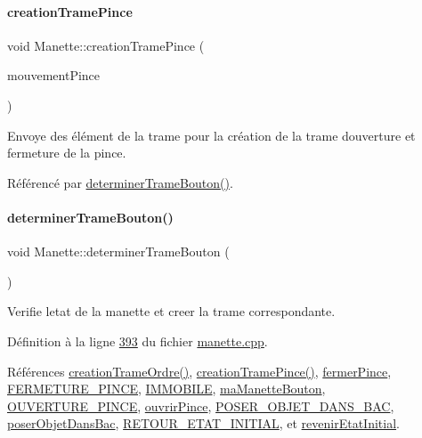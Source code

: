 \paragraph{\texorpdfstring{creation\+Trame\+Pince}{creationTramePince}}
{\footnotesize\ttfamily void Manette\+::creation\+Trame\+Pince (\begin{DoxyParamCaption}\item[{Q\+String}]{mouvement\+Pince }\end{DoxyParamCaption})\hspace{0.3cm}{\ttfamily [signal]}}



Envoye des élément de la trame pour la création de la trame d\textquotesingle{}ouverture et fermeture de la pince. 



Référencé par \hyperlink{manette_8cpp_source_l00393}{determiner\+Trame\+Bouton()}.

\mbox{\label{class_manette_a3fb9d1245400b6bb6379fbb63a8099ba}} 
\paragraph{\texorpdfstring{determiner\+Trame\+Bouton()}{determinerTrameBouton()}}
{\footnotesize\ttfamily void Manette\+::determiner\+Trame\+Bouton (\begin{DoxyParamCaption}{ }\end{DoxyParamCaption})}



Verifie l\textquotesingle{}etat de la manette et creer la trame correspondante. 



Définition à la ligne \hyperlink{manette_8cpp_source_l00393}{393} du fichier \hyperlink{manette_8cpp_source}{manette.\+cpp}.



Références \hyperlink{class_manette_ad28d8f539df6b73805ae94e9bbd827ec}{creation\+Trame\+Ordre()}, \hyperlink{class_manette_a16cb602cf7001f78b115f395fad47586}{creation\+Trame\+Pince()}, \hyperlink{manette_8h_source_l00217}{fermer\+Pince}, \hyperlink{manette_8h_source_l00086}{F\+E\+R\+M\+E\+T\+U\+R\+E\+\_\+\+P\+I\+N\+CE}, \hyperlink{manette_8h_source_l00032}{I\+M\+M\+O\+B\+I\+LE}, \hyperlink{manette_8h_source_l00215}{ma\+Manette\+Bouton}, \hyperlink{manette_8h_source_l00080}{O\+U\+V\+E\+R\+T\+U\+R\+E\+\_\+\+P\+I\+N\+CE}, \hyperlink{manette_8h_source_l00216}{ouvrir\+Pince}, \hyperlink{manette_8h_source_l00092}{P\+O\+S\+E\+R\+\_\+\+O\+B\+J\+E\+T\+\_\+\+D\+A\+N\+S\+\_\+\+B\+AC}, \hyperlink{manette_8h_source_l00218}{poser\+Objet\+Dans\+Bac}, \hyperlink{manette_8h_source_l00074}{R\+E\+T\+O\+U\+R\+\_\+\+E\+T\+A\+T\+\_\+\+I\+N\+I\+T\+I\+AL}, et \hyperlink{manette_8h_source_l00219}{revenir\+Etat\+Initial}.



